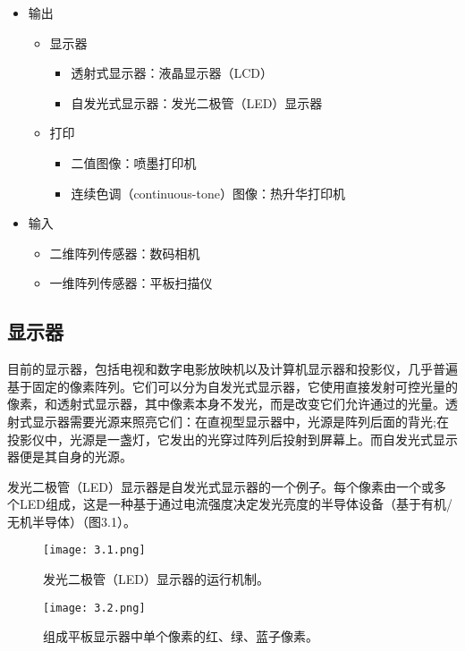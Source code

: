 \documentclass[lang=cn,12pt]{elegantbook}
\begin{document}
\begin{itemize}
  \item 输出
        \begin{itemize}
          \item 显示器
                \begin{itemize}
                  \item 透射式显示器：液晶显示器（LCD）
                  \item 自发光式显示器：发光二极管（LED）显示器
                \end{itemize}
          \item 打印
                \begin{itemize}
                  \item 二值图像：喷墨打印机
                  \item 连续色调（continuous-tone）图像：热升华打印机
                \end{itemize}
        \end{itemize}
  \item 输入
        \begin{itemize}
          \item 二维阵列传感器：数码相机
          \item 一维阵列传感器：平板扫描仪
        \end{itemize}
\end{itemize}

\subsection{显示器}

目前的显示器，包括电视和数字电影放映机以及计算机显示器和投影仪，几乎普遍基于固定的像素阵列。它们可以分为自发光式显示器，它使用直接发射可控光量的像素，和透射式显示器，其中像素本身不发光，而是改变它们允许通过的光量。透射式显示器需要光源来照亮它们：在直视型显示器中，光源是阵列后面的背光;在投影仪中，光源是一盏灯，它发出的光穿过阵列后投射到屏幕上。而自发光式显示器便是其自身的光源。

发光二极管（LED）显示器是自发光式显示器的一个例子。每个像素由一个或多个LED组成，这是一种基于通过电流强度决定发光亮度的半导体设备（基于有机/无机半导体）（图3.1）。

\begin{figure}[htb]
  \centering
  \begin{minipage}[t]{0.45\textwidth}
    \centering
    \texttt{[image: 3.1.png]}
    \caption{发光二极管（LED）显示器的运行机制。}
  \end{minipage}
  \begin{minipage}[t]{0.45\textwidth}
    \centering
    \texttt{[image: 3.2.png]}
    \caption{组成平板显示器中单个像素的红、绿、蓝子像素。}
  \end{minipage}
\end{figure}
\end{document}
